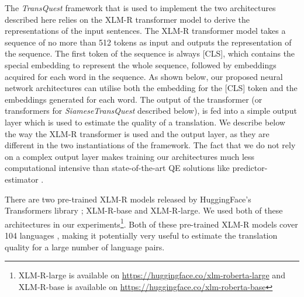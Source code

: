 The \textit{TransQuest} framework that is used to implement the two architectures described here relies on the XLM-R transformer model \cite{conneau-etal-2020-unsupervised} to derive the representations of the input sentences. The XLM-R transformer model takes a sequence of no more than 512 tokens as input and outputs the representation of the sequence. The first token of the sequence is always \textsc{[CLS]}, which contains the special embedding to represent the whole sequence, followed by embeddings acquired for each word in the sequence. As shown below, our proposed neural network architectures can utilise both the embedding for the \textsc{[CLS]} token and the embeddings generated for each word. The output of the transformer (or transformers for \textit{SiameseTransQuest} described below), is fed into a simple output layer which is used to estimate the quality of a translation. We describe below the way the XLM-R transformer is used and the output layer, as they are different in the two instantiations of the framework. The fact that we do not rely on a complex output layer makes training our architectures much less computational intensive than state-of-the-art QE solutions like predictor-estimator \cite{lee-2020-two, wang-etal-2018-alibaba}.

There are two pre-trained XLM-R models released by HuggingFace's Transformers library \cite{wolf-etal-2020-transformers}; XLM-R-base and XLM-R-large. We used both of these architectures in our experiments\footnote{XLM-R-large is available on \url{https://huggingface.co/xlm-roberta-large} and XLM-R-base is available on \url{https://huggingface.co/xlm-roberta-base}}. Both of these pre-trained XLM-R models cover 104 languages \cite{conneau-etal-2020-unsupervised}, making it potentially very useful to estimate the translation quality for a large number of language pairs.

